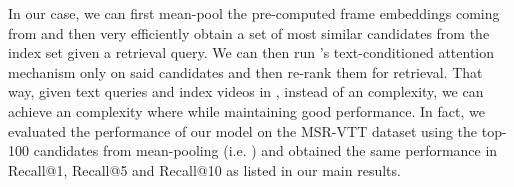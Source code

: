 \documentclass[10pt,twocolumn,letterpaper]{article}
\begin{document}
In our case, we can first mean-pool the pre-computed frame embeddings coming from \ModelName{} and then very efficiently obtain a set of  most similar candidates from the index set given a retrieval query. We can then run \ModelName{}’s text-conditioned attention mechanism only on said candidates and then re-rank them for retrieval. That way, given  text queries and  index videos in , instead of an  complexity, we can achieve an  complexity where  while maintaining good performance. In fact, we evaluated the performance of our model on the MSR-VTT dataset using the top-100 candidates from mean-pooling (i.e. ) and obtained the same performance in Recall@1, Recall@5 and Recall@10 as listed in our main results. 
\end{document}
